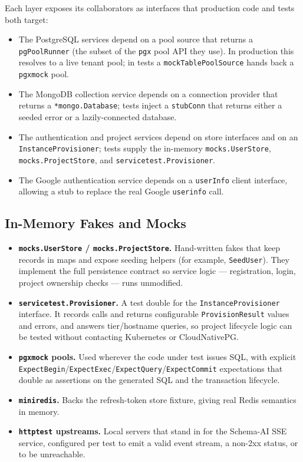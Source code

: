 Each layer exposes its collaborators as interfaces that production code and tests both target:

\begin{itemize}
    \item The PostgreSQL services depend on a pool source that returns a \texttt{pgPoolRunner} (the subset of the \texttt{pgx} pool API they use). In production this resolves to a live tenant pool; in tests a \texttt{mockTablePoolSource} hands back a \texttt{pgxmock} pool.
    \item The MongoDB collection service depends on a connection provider that returns a \texttt{*mongo.Database}; tests inject a \texttt{stubConn} that returns either a seeded error or a lazily-connected database.
    \item The authentication and project services depend on store interfaces and on an \texttt{InstanceProvisioner}; tests supply the in-memory \texttt{mocks.UserStore}, \texttt{mocks.ProjectStore}, and \texttt{servicetest.Provisioner}.
    \item The Google authentication service depends on a \texttt{userInfo} client interface, allowing a stub to replace the real Google \texttt{userinfo} call.
\end{itemize}

\subsection{In-Memory Fakes and Mocks}

\begin{itemize}
    \item \textbf{\texttt{mocks.UserStore} / \texttt{mocks.ProjectStore}.} Hand-written fakes that keep records in maps and expose seeding helpers (for example, \texttt{SeedUser}). They implement the full persistence contract so service logic --- registration, login, project ownership checks --- runs unmodified.
    \item \textbf{\texttt{servicetest.Provisioner}.} A test double for the \texttt{InstanceProvisioner} interface. It records calls and returns configurable \texttt{ProvisionResult} values and errors, and answers tier/hostname queries, so project lifecycle logic can be tested without contacting Kubernetes or CloudNativePG.
    \item \textbf{\texttt{pgxmock} pools.} Used wherever the code under test issues SQL, with explicit \texttt{ExpectBegin}/\texttt{ExpectExec}/\texttt{ExpectQuery}/\texttt{ExpectCommit} expectations that double as assertions on the generated SQL and the transaction lifecycle.
    \item \textbf{\texttt{miniredis}.} Backs the refresh-token store fixture, giving real Redis semantics in memory.
    \item \textbf{\texttt{httptest} upstreams.} Local servers that stand in for the Schema-AI SSE service, configured per test to emit a valid event stream, a non-2xx status, or to be unreachable.
\end{itemize}

